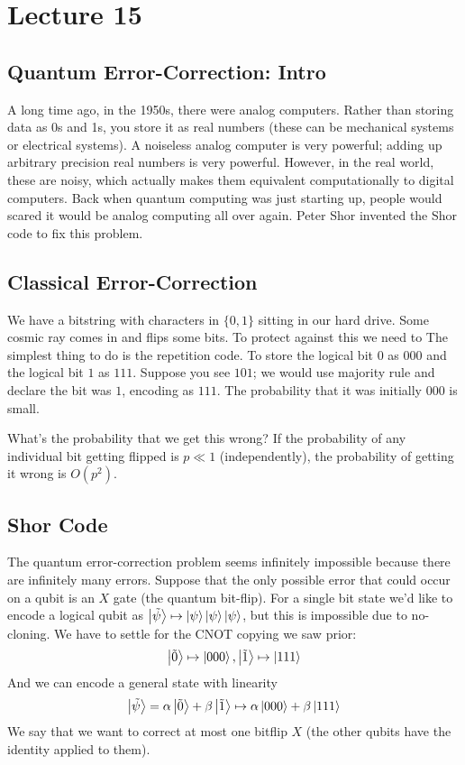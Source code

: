 \section{Lecture 15}

\subsection{Quantum Error-Correction: Intro}
A long time ago, in the 1950s, there were analog computers. Rather than storing data as
0s and 1s, you store it as real numbers (these can be mechanical systems or electrical systems).
A noiseless analog computer is very powerful; adding up arbitrary precision real numbers is very powerful.
However, in the real world, these are noisy, which actually makes them equivalent computationally to digital computers.
Back when quantum computing was just starting up, people would scared it would be analog computing all over again.
Peter Shor invented the Shor code to fix this problem.

\subsection{Classical Error-Correction}
We have a bitstring with characters in $\{0, 1\}$ sitting in our hard drive. Some cosmic ray comes in
and flips some bits. To protect against this we need to  The simplest thing to do is the repetition code.
To store the logical bit $0$ as $000$ and the logical bit $1$ as $111$. Suppose you see $101$;
we would use majority rule and declare the bit was $1$, encoding as $111$.
The probability that it was initially $000$ is small.

What's the probability that we get this wrong? If the probability of any individual bit getting flipped is $p \ll 1$ (independently),
the probability of getting it wrong is $O(p^2)$.

\subsection{Shor Code}
The quantum error-correction problem seems infinitely impossible because there are infinitely many errors. Suppose that
the only possible error that could occur on a qubit is an $X$ gate (the quantum bit-flip). For a single bit state
we'd like to encode a logical qubit as
$\ket{\tilde{\psi}} \mapsto \ket{\psi}\ket{\psi}\ket{\psi}$,
but this is impossible due to no-cloning.
We have to settle for the CNOT copying we saw prior:
\[ \ket{\tilde{0}} \mapsto \ket{000}, \ket{\tilde{1}} \mapsto \ket{111} \]
And we can encode a general state with linearity
\[ \ket{\tilde{\psi}} = \alpha \ket{\tilde{0}} + \beta \ket{\tilde{1}} \mapsto \alpha \ket{000} + \beta \ket{111} \]
We say that we want to correct at most one bitflip $X$ (the other qubits have the identity applied to them).

